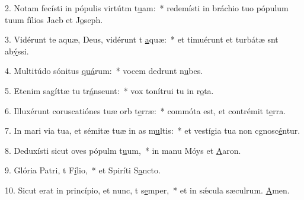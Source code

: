 2. Notam fecísti in pópulis virtútm t\uline{u}am:~* redemísti in bráchio tuo pópulum tuum fílios Jacb et J\uline{o}seph.\par 
3. Vidérunt te aquæ, Deus, vidérunt t \uline{a}quæ:~* et timuérunt et turbátæ snt ab\uline{ý}ssi.\par 
4. Multitúdo sónitus \uline{quá}rum:~* vocem dedrunt n\uline{u}bes.\par 
5. Etenim sagíttæ tu tr\uline{á}nseunt:~* vox tonítrui tu in r\uline{o}ta.\par 
6. Illuxérunt coruscatiónes tuæ orb t\uline{e}rræ:~* commóta est, et contrémit t\uline{e}rra.\par 
7. In mari via tua, et sémitæ tuæ in as m\uline{u}ltis:~* et vestígia tua non cgnosc\uline{é}ntur.\par 
8. Deduxísti sicut oves pópulm t\uline{u}um,~* in manu Móys et \uline{A}aron.\par 
9. Glória Patri, t F\uline{í}lio,~* et Spiríti S\uline{a}ncto.\par 
10. Sicut erat in princípio, et nunc, t s\uline{e}mper,~* et in sǽcula sæculrum. \uline{A}men.\par 
